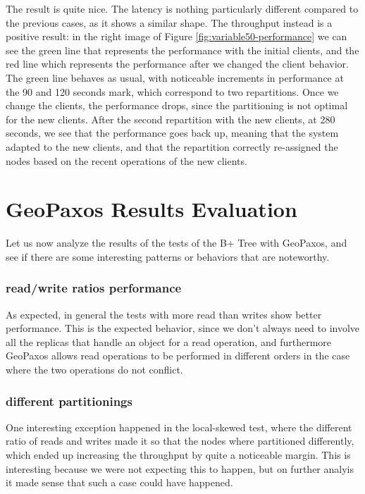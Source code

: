The result is quite nice. The latency is nothing particularly different compared to the previous cases, as it shows a similar shape. The throughput instead is a positive result: in the right image of Figure \ref{fig:variable50-performance} we can see the green line that represents the performance with the initial clients, and the red line which represents the performance after we changed the client behavior. The green line behaves as usual, with noticeable increments in performance at the 90 and 120 seconds mark, which correspond to two repartitions. Once we change the clients, the performance drops, since the partitioning is not optimal for the new clients. After the second repartition with the new clients, at 280 seconds, we see that the performance goes back up, meaning that the system adapted to the new clients, and that the repartition correctly re-assigned the nodes based on the recent operations of the new clients.

\section{GeoPaxos Results Evaluation}\label{sec:geopaxos-results-evaluation}
Let us now analyze the results of the tests of the B+ Tree with GeoPaxos, and see if there are some interesting patterns or behaviors that are noteworthy.

\subsubsection{read/write ratios performance}
As expected, in general the tests with more read than writes show better performance. This is the expected behavior, since we don't always need to involve all the replicas that handle an object for a read operation, and furthermore GeoPaxos allows read operations to be performed in different orders in the case where the two operations do not conflict.

\subsubsection{different partitionings}
One interesting exception happened in the local-skewed test, where the different ratio of reads and writes made it so that the nodes where partitioned differently, which ended up increasing the throughput by quite a noticeable margin. This is interesting because we were not expecting this to happen, but on further analyis it made sense that such a case could have happened.

